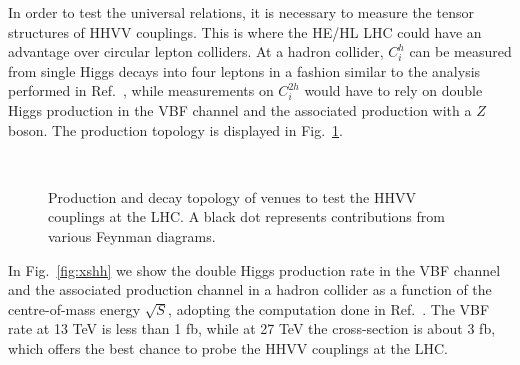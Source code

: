 
In order to test the universal relations, it is necessary to measure the tensor structures of HHVV couplings. This is where the HE/HL LHC could have an advantage over circular lepton colliders. At a hadron collider, $C^h_i$ can be measured from single Higgs decays into four leptons in a fashion similar to the analysis performed in Ref.~\cite{Sirunyan:2017tqd}, while measurements on $C^{2h}_i$ would have to rely on double Higgs production in the VBF  channel and the associated production with a $Z$ boson. The production topology is displayed in Fig.~\ref{fig:testhh}.


\begin{figure}[!t]
\centering
  \quad \ \ %
  \caption{Production and decay topology of venues to test the HHVV couplings at the LHC. A black dot represents contributions from various Feynman diagrams. \label{fig:testhh}}
\end{figure}



In Fig.~\ref{fig:xshh}  we show the double Higgs production rate in the VBF channel and the associated production channel in a hadron collider as a function of the centre-of-mass energy $\sqrt{S}$, adopting the computation done in Ref.~\cite{Frederix:2014hta}. The VBF rate at 13 TeV is less than 1 fb, while at 27 TeV the cross-section is about 3 fb, which offers the best chance to probe the HHVV couplings at the LHC. 

